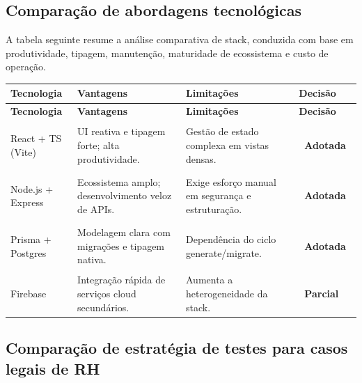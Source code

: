 \documentclass[11pt,a4paper,twoside]{article}
\newcommand{\tagn}[1]{{\setlength{\fboxsep}{1.5pt}\colorbox{TAGNEUTRAL}{\scriptsize\sffamily\bfseries\color{white}~#1~}}}
\newcommand{\tH}[1]{\textbf{\sffamily\small\color{white}#1}}
\newcommand{\theadrow}{\rowcolor{ACCENT}}
\begin{document}
\subsection{Comparação de abordagens tecnológicas}

A tabela seguinte resume a análise comparativa de stack, conduzida com base em produtividade, tipagem, manutenção, maturidade de ecossistema e custo de operação.

\begin{longtable}{>{\small\bfseries}p{2.8cm} >{\small\raggedright\arraybackslash}p{4.4cm} >{\small\raggedright\arraybackslash}p{4.4cm} >{\small\centering\arraybackslash}p{2.4cm}}
\theadrow
\tH{Tecnologia} & \tH{Vantagens} & \tH{Limitações} & \tH{Decisão} \\
\midrule
\endfirsthead
\theadrow
\tH{Tecnologia} & \tH{Vantagens} & \tH{Limitações} & \tH{Decisão} \\
\midrule
\endhead

React + TS (Vite) & UI reativa e tipagem forte; alta produtividade. & Gestão de estado complexa em vistas densas. & \tagn{Adotada} \\ \addlinespace[4pt]

Node.js + Express & Ecossistema amplo; desenvolvimento veloz de APIs. & Exige esforço manual em segurança e estruturação. & \tagn{Adotada} \\ \addlinespace[4pt]

Prisma + Postgres & Modelagem clara com migrações e tipagem nativa. & Dependência do ciclo generate/migrate. & \tagn{Adotada} \\ \addlinespace[4pt]

Firebase & Integração rápida de serviços cloud secundários. & Aumenta a heterogeneidade da stack. & \tagn{Parcial} \\
\bottomrule
\end{longtable}

\subsection{Comparação de estratégia de testes para casos legais de RH}
\end{document}
